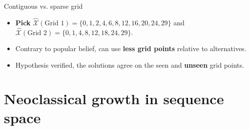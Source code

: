 \documentclass[aspectratio=169,10pt]{beamer}
\newcommand{\emphcolor}[1]{\textbf{\textcolor{emphcolorval}{#1}}}
\newcommand{\Xtrain}{\hat{\mathcal{X}}}
\begin{document}
\begin{frame}{Contiguous vs. sparse grid}
	\begin{minipage}[t]{0.4\textwidth}
	\end{minipage}
	\hfill%
	\begin{minipage}[t]{0.5\textwidth}\raggedleft
		\begin{itemize}
			\item \emphcolor{Pick} $\Xtrain({\text{Grid 1}})  = \{0, 1, 2, 4, 6, 8, 12, 16, 20, 24, 29\}$ and $\Xtrain({\text{Grid 2}}) = \{0, 1, 4, 8, 12, 18, 24, 29\}$.
			\smallskip
			\item Contrary to popular belief, can use \emphcolor{less grid points} relative to alternatives. 
			\smallskip
				\item Hypothesis verified, the solutions agree on the seen and \emphcolor{unseen} grid points. \smallskip
		\end{itemize}
	\end{minipage}
\end{frame}


\section{Neoclassical growth in sequence space}
\end{document}

